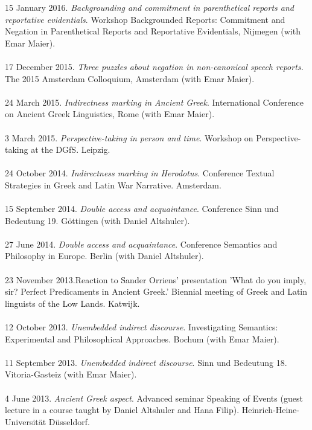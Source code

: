 \documentclass[a4paper,11pt]{article}
\begin{document}
15 January 2016. \emph{Backgrounding and commitment in parenthetical reports and reportative evidentials}. Workshop Backgrounded Reports:
Commitment and Negation in Parenthetical Reports and Reportative Evidentials, Nijmegen (with Emar Maier).\\\\
17 December 2015. \emph{Three puzzles about negation in non-canonical speech reports.} The 2015 Amsterdam Colloquium, Amsterdam (with Emar Maier).\\\\
24 March 2015. \emph{Indirectness marking in Ancient Greek}. International Conference on Ancient Greek Linguistics, Rome (with Emar Maier).\\\\
3 March 2015. \emph{Perspective-taking in person and time}. Workshop on Perspective-taking at the DGfS. Leipzig.\\\\ 
24 October 2014. \emph{Indirectness marking in Herodotus}. Conference Textual Strategies in Greek and Latin War Narrative. Amsterdam.\\\\
15 September 2014. \emph{Double access and acquaintance}. Conference Sinn und Bedeutung 19. G\"ottingen (with Daniel Altshuler).\\\\
27 June 2014. \emph{Double access and acquaintance}. Conference Semantics and Philosophy in Europe. Berlin (with Daniel Altshuler).\\\\
23 November 2013.Reaction to Sander Orriens' presentation 'What do you imply, sir? Perfect Predicaments in Ancient Greek.' Biennial meeting of Greek and Latin linguists of the Low Lands. Katwijk.\\\\
12 October 2013. \emph{Unembedded indirect discourse}. Investigating Semantics: Experimental and Philosophical Approaches. Bochum (with Emar Maier).\\\\ 
11 September 2013. \emph{Unembedded indirect discourse}. Sinn und Bedeutung 18. Vitoria-Gasteiz (with Emar Maier). \\\\
4 June 2013. \emph{Ancient Greek aspect}. Advanced seminar Speaking of Events (guest lecture in a course taught by Daniel Altshuler and Hana Filip). Heinrich-Heine-Universit\"at D\"usseldorf.\\\\ 
\end{document}

